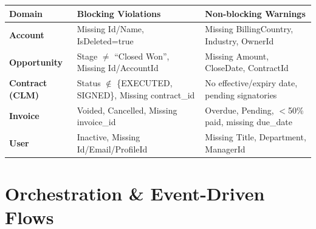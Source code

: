 \documentclass[8pt,a4paper]{article}
\begin{document}
\vspace{0.1em}
\begin{table}[H]
\scriptsize
\begin{tabularx}{\textwidth}{@{}llX@{}}
\toprule
\textbf{Domain} & \textbf{Blocking Violations} & \textbf{Non-blocking Warnings} \\
\midrule
\textbf{Account} & Missing Id/Name, IsDeleted=true & Missing BillingCountry, Industry, OwnerId \\
\textbf{Opportunity} & Stage $\neq$ ``Closed Won'', Missing Id/AccountId & Missing Amount, CloseDate, ContractId \\
\textbf{Contract (CLM)} & Status $\notin$ \{EXECUTED, SIGNED\}, Missing contract\_id & No effective/expiry date, pending signatories \\
\textbf{Invoice} & Voided, Cancelled, Missing invoice\_id & Overdue, Pending, $<$50\% paid, missing due\_date \\
\textbf{User} & Inactive, Missing Id/Email/ProfileId & Missing Title, Department, ManagerId \\
\bottomrule
\end{tabularx}
\end{table}

\section{Orchestration \& Event-Driven Flows}
\end{document}
